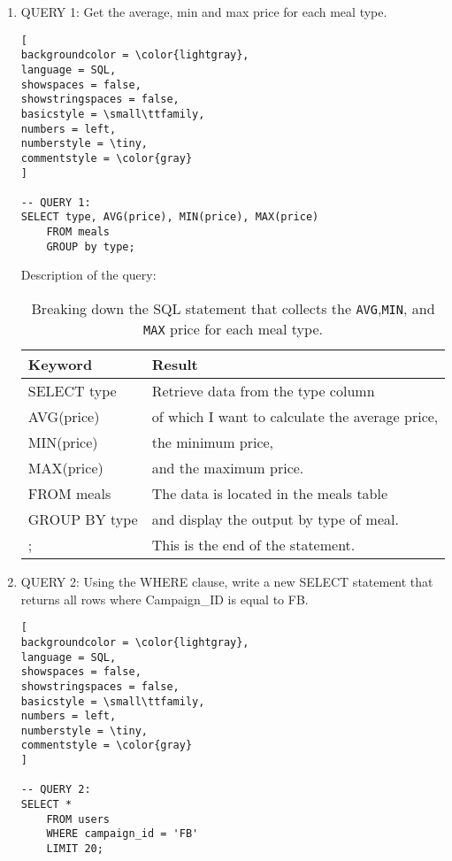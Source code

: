 \documentclass[]{article}
\newcommand{\code}[1]{\colorbox{light-gray}{\texttt{#1}}}
\begin{document}
\begin{enumerate}

\item QUERY 1: Get the average, min and max price for each meal type.

\begin{lstlisting}[
backgroundcolor = \color{lightgray},
language = SQL,
showspaces = false,
showstringspaces = false,
basicstyle = \small\ttfamily,
numbers = left,
numberstyle = \tiny,
commentstyle = \color{gray}
]

-- QUERY 1: 
SELECT type, AVG(price), MIN(price), MAX(price) 
	FROM meals 
	GROUP by type; 

\end{lstlisting}

Description of the query:
\pagebreak
\begin{table}[!ht]
		\centering
		\begin{tabular}{| l | l |}
			\hline
			Keyword & Result \\
			\hline
			SELECT type & Retrieve data from the type column \\
			AVG(price) & of which I want to calculate the average price,\\
			MIN(price) & the minimum price,  \\
			MAX(price) & and the maximum price. \\
			FROM meals & The data is located in the meals table \\
			GROUP BY type & and display the output by type of meal. \\
			; & This is the end of the statement.\\
			\hline
		\end{tabular}
		\caption{Breaking down the SQL statement that collects the \code{AVG},\code{MIN}, and \code{MAX} price for each meal type.}
\end{table}

\item QUERY 2: Using the WHERE clause, write a new SELECT statement that returns all rows where Campaign\_ID is equal to FB.

\begin{lstlisting}[
backgroundcolor = \color{lightgray},
language = SQL,
showspaces = false,
showstringspaces = false,
basicstyle = \small\ttfamily,
numbers = left,
numberstyle = \tiny,
commentstyle = \color{gray}
]

-- QUERY 2: 
SELECT * 
	FROM users 
	WHERE campaign_id = 'FB' 
	LIMIT 20;
	
\end{lstlisting}


\end{enumerate}
\end{document}
